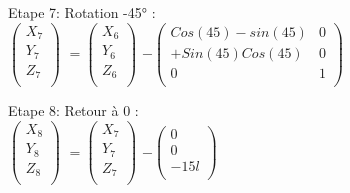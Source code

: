 Etape 7: Rotation -45° : \\

$
\begin{pmatrix}
  X_{7} \\
  Y_{7} \\
  Z_{7} \\
\end{pmatrix}
$
\vspace{5mm} %
$
=
\begin{pmatrix}
  X_{6} \\
  Y_{6} \\
  Z_{6} \\
\end{pmatrix}
$
\vspace{5mm} %
$
 -
\begin{pmatrix}
  Cos(45)-sin(45) & 0  \\
  +Sin(45)Cos(45) & 0 \\
  0 & 1 \\
\end{pmatrix}
$

Etape 8: Retour à 0 : \\

$
\begin{pmatrix}
  X_{8} \\
  Y_{8} \\
  Z_{8} \\
\end{pmatrix}
$
\vspace{5mm} %
$
=
\begin{pmatrix}
  X_{7} \\
  Y_{7} \\
  Z_{7} \\
\end{pmatrix}
$
\vspace{5mm} %
$
 -
\begin{pmatrix}
  0  \\
  0 \\
  -15l \\
\end{pmatrix}
$
